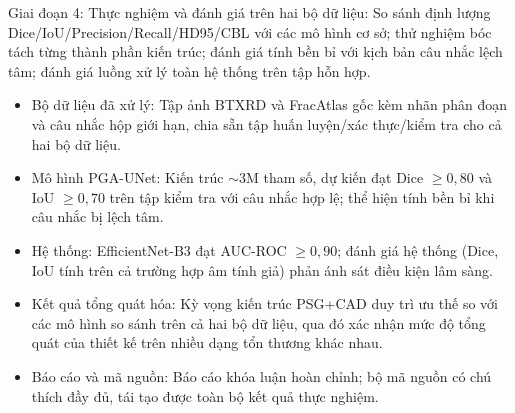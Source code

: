 Giai đoạn 4: Thực nghiệm và đánh giá trên hai bộ dữ liệu: So sánh định lượng Dice/IoU/Precision/Recall/HD95/CBL với các mô hình cơ sở; thử nghiệm bóc tách từng thành phần kiến trúc; đánh giá tính bền bỉ với kịch bản câu nhắc lệch tâm; đánh giá luồng xử lý toàn hệ thống trên tập hỗn hợp.

\medskip
{}

\medskip
\begin{itemize}
    \item Bộ dữ liệu đã xử lý: Tập ảnh BTXRD và FracAtlas gốc kèm nhãn phân đoạn và câu nhắc hộp giới hạn, chia sẵn tập huấn luyện/xác thực/kiểm tra cho cả hai bộ dữ liệu.
    \item Mô hình PGA-UNet: Kiến trúc $\sim$3M tham số, dự kiến đạt Dice $\geq 0{,}80$ và IoU $\geq 0{,}70$ trên tập kiểm tra với câu nhắc hợp lệ; thể hiện tính bền bỉ khi câu nhắc bị lệch tâm.
    \item Hệ thống: EfficientNet-B3 đạt AUC-ROC $\geq 0{,}90$; đánh giá hệ thống (Dice, IoU tính trên cả trường hợp âm tính giả) phản ánh sát điều kiện lâm sàng.
    \item Kết quả tổng quát hóa: Kỳ vọng kiến trúc PSG+CAD duy trì ưu thế so với các mô hình so sánh trên cả hai bộ dữ liệu, qua đó xác nhận mức độ tổng quát của thiết kế trên nhiều dạng tổn thương khác nhau.
    \item Báo cáo và mã nguồn: Báo cáo khóa luận hoàn chỉnh; bộ mã nguồn có chú thích đầy đủ, tái tạo được toàn bộ kết quả thực nghiệm.
\end{itemize}

\medskip
{}

\medskip
\begin{table}[H]
\renewcommand{\arraystretch}{1.4}
\end{table}

